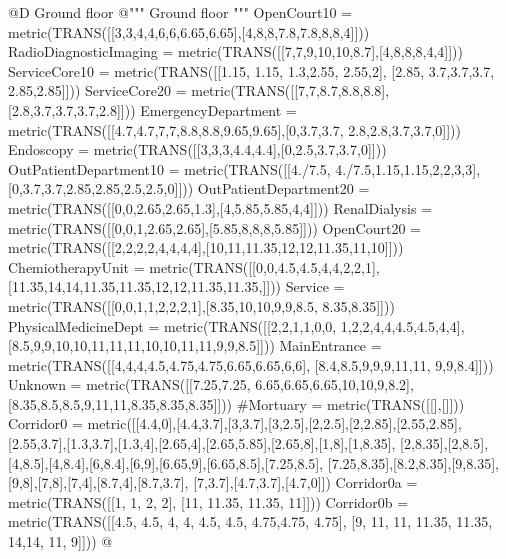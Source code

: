 \documentclass[11pt,oneside]{article}    %
\begin{document}
@D Ground floor 
@{""" Ground floor """
OpenCourt10 = metric(TRANS([[3,3,4,4,6,6,6.65,6.65],[4,8,8,7.8,7.8,8,8,4]]))
RadioDiagnosticImaging = metric(TRANS([[7,7,9,10,10,8.7],[4,8,8,8,4,4]]))
ServiceCore10 = metric(TRANS([[1.15, 1.15, 1.3,2.55, 2.55,2], [2.85, 3.7,3.7,3.7, 
    2.85,2.85]]))
ServiceCore20 = metric(TRANS([[7,7,8.7,8.8,8.8],[2.8,3.7,3.7,3.7,2.8]]))
EmergencyDepartment = metric(TRANS([[4.7,4.7,7,7,8.8,8.8,9.65,9.65],[0,3.7,3.7,
    2.8,2.8,3.7,3.7,0]]))
Endoscopy = metric(TRANS([[3,3,3,4.4,4.4],[0,2.5,3.7,3.7,0]]))
OutPatientDepartment10 = metric(TRANS([[4./7.5, 4./7.5,1.15,1.15,2,2,3,3],
    [0,3.7,3.7,2.85,2.85,2.5,2.5,0]]))
OutPatientDepartment20 = metric(TRANS([[0,0,2.65,2.65,1.3],[4,5.85,5.85,4,4]]))
RenalDialysis = metric(TRANS([[0,0,1,2.65,2.65],[5.85,8,8,8,5.85]]))
OpenCourt20 = metric(TRANS([[2,2,2,2,4,4,4,4],[10,11,11.35,12,12,11.35,11,10]]))
ChemiotherapyUnit = metric(TRANS([[0,0,4.5,4.5,4,4,2,2,1],
    [11.35,14,14,11.35,11.35,12,12,11.35,11.35,]]))
Service = metric(TRANS([[0,0,1,1,2,2,2,1],[8.35,10,10,9,9,8.5, 8.35,8.35]]))
PhysicalMedicineDept = metric(TRANS([[2,2,1,1,0,0, 1,2,2,4,4,4.5,4.5,4,4],
    [8.5,9,9,10,10,11,11,11,10,10,11,11,9,9,8.5]]))
MainEntrance = metric(TRANS([[4,4,4,4.5,4.75,4.75,6.65,6.65,6,6],
    [8.4,8.5,9,9,9,11,11, 9,9,8.4]]))
Unknown = metric(TRANS([[7.25,7.25, 6.65,6.65,6.65,10,10,9,8.2],
    [8.35,8.5,8.5,9,11,11,8.35,8.35,8.35]]))
#Mortuary = metric(TRANS([[],[]]))
Corridor0 = metric([[4.4,0],[4.4,3.7],[3,3.7],[3,2.5],[2,2.5],[2,2.85],[2.55,2.85],
    [2.55,3.7],[1.3,3.7],[1.3,4],[2.65,4],[2.65,5.85],[2.65,8],[1,8],[1,8.35],
    [2,8.35],[2,8.5],[4,8.5],[4,8.4],[6,8.4],[6,9],[6.65,9],[6.65,8.5],[7.25,8.5],
    [7.25,8.35],[8.2,8.35],[9,8.35],[9,8],[7,8],[7,4],[8.7,4],[8.7,3.7],
    [7,3.7],[4.7,3.7],[4.7,0]])
Corridor0a = metric(TRANS([[1, 1, 2, 2], [11, 11.35, 11.35, 11]]))
Corridor0b = metric(TRANS([[4.5, 4.5, 4, 4, 4.5, 4.5, 4.75,4.75, 4.75],
    [9, 11, 11, 11.35, 11.35, 14,14, 11, 9]]))
@}
\end{document}
